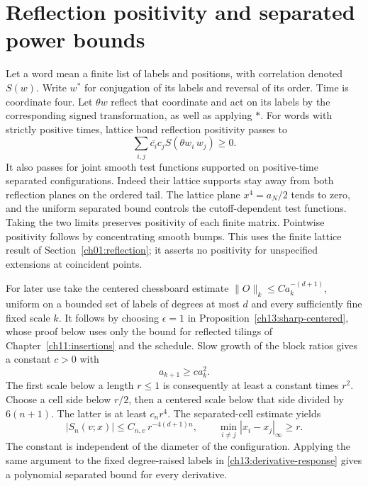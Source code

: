 \section{Reflection positivity and separated power bounds}
\label{ch13:positivity}

Let a word mean a finite list of labels and positions, with correlation
denoted $S(w)$. Write $w^*$ for conjugation of its labels and reversal
of its order. Time is coordinate four. Let $\theta w$ reflect that
coordinate and act on its labels by the corresponding signed
transformation, as well as applying $*$. For words with strictly
positive times, lattice bond reflection positivity passes to
\[
 \sum_{i,j}\overline{c_i}c_j S(\theta w_i\,w_j)\ge0.
\]
It also passes for joint smooth test functions supported on positive-time
separated configurations. Indeed their lattice supports stay away
from both reflection planes on the ordered tail. The lattice plane
$x^4=a_N/2$ tends to zero, and the uniform separated bound controls
the cutoff-dependent test functions. Taking the two limits preserves positivity of each
finite matrix. Pointwise positivity follows by concentrating smooth
bumps. This uses the finite lattice result of
Section~\ref{ch01:reflection}; it asserts no positivity for unspecified
extensions at coincident points.

For later use take the centered chessboard estimate
$\|O\|_k\le C a_k^{-(d+1)}$, uniform on a bounded set of labels
of degrees at most $d$ and every sufficiently fine fixed scale $k$.
It follows by choosing $\epsilon=1$ in
Proposition~\ref{ch13:sharp-centered}, whose proof below uses only
the bound for reflected tilings of Chapter~\ref{ch11:insertions} and the
schedule. Slow growth of the block
ratios gives a constant $c>0$ with
\begin{equation}
                         a_{k+1}\ge c a_k^2.
 \label{ch13:scale-thickness}
\end{equation}
The first scale below a length $r\le1$ is consequently at least a
constant times $r^2$. Choose a cell side below $r/2$, then a centered
scale below that side divided by $6(n+1)$. The latter is at least
$c_n r^4$. The separated-cell estimate yields
\begin{equation}
 |S_n(v;x)|\le C_{n,v}\,r^{-4(d+1)n},
 \qquad \min_{i\ne j}|x_i-x_j|_\infty\ge r.
 \label{ch13:power}
\end{equation}
The constant is independent of the diameter of the configuration.
Applying the same argument to the fixed degree-raised labels in
\eqref{ch13:derivative-response} gives a polynomial separated bound
for every derivative.

